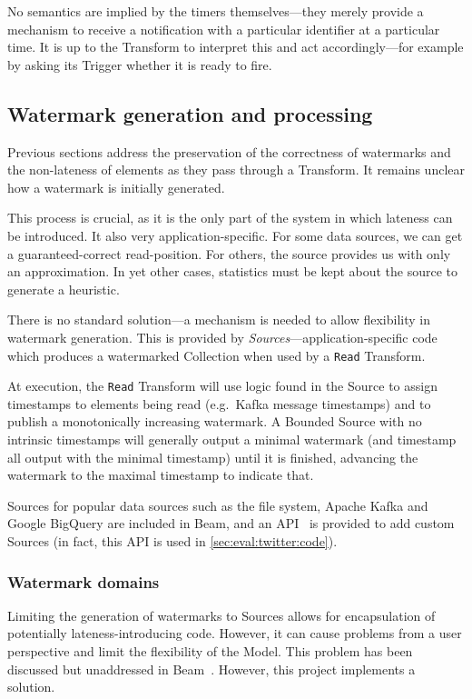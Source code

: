No semantics are implied by the timers themselves---they merely provide a mechanism to receive a notification with a particular identifier at a particular time.
It is up to the Transform to interpret this and act accordingly---for example by asking its Trigger whether it is ready to fire.

\subsection{Watermark generation and processing}\label{sec:impl:dataflow:watermark-generation}

Previous sections address the preservation of the correctness of watermarks and the non-lateness of elements as they pass through a Transform.
It remains unclear how a watermark is initially generated.

This process is crucial, as it is the only part of the system in which lateness can be introduced.
It also very application-specific.
For some data sources, we can get a guaranteed-correct read-position.
For others, the source provides us with only an approximation.
In yet other cases, statistics must be kept about the source to generate a heuristic.

There is no standard solution---a mechanism is needed to allow flexibility in watermark generation.
This is provided by \emph{Sources}---application-specific code which produces a watermarked Collection when used by a \verb|Read| Transform.

At execution, the \verb|Read| Transform will use logic found in the Source to assign timestamps to elements being read (e.g.\ Kafka message timestamps) and to publish a monotonically increasing watermark.
A Bounded Source with no intrinsic timestamps will generally output a minimal watermark (and timestamp all output with the minimal timestamp) until it is finished, advancing the watermark to the maximal timestamp to indicate that.

Sources for popular data sources such as the file system, Apache Kafka and Google BigQuery are included in Beam, and an API~\cite{BEAM-code-SourceAPI} is provided to add custom Sources (in fact, this API is used in \cref{sec:eval:twitter:code}).

\subsubsection{Watermark domains}

Limiting the generation of watermarks to Sources allows for encapsulation of potentially lateness-introducing code.
However, it can cause problems from a user perspective and limit the flexibility of the Model.
This problem has been discussed but unaddressed in Beam~\cite{Beam-JIRA-watermark-domains}.
However, this project implements a solution.


